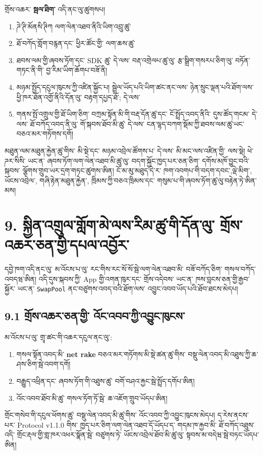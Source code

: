 \documentclass[11pt]{article}
\begin{document}
གྲོས་འཆར་ \textbf{སྦལ་ཐིག་} འདི་ནང་ལུ་ཚུགསཔ།

\begin{enumerate}[leftmargin=*]
\item ཌེ་ཊི་མོནསི་ཊིཀ ལག་ལེན་འཐབ་ནིའི་ཡིག་འབྲུ་ཚུ་
\item ཐོ་བཀོད་གློག་བརྙན་དང་ ཕྱིར་ཚོང་གྱི་ ལག་ཆས་ཚུ་
\item ཐབས་ལམ་གྱི་ཞབས་ཏོག་དང་ SDK ཚུ་ དེ་ལས་ བརྡ་འགྲེལཔ་ཚུ་ལུ་ རྩ་སྒྲིག་གསརཔ་ཅིག་ལུ་ བཏོན་གཏང་ནི་གི་ བྱ་རིམ་ཡིག་ཆོགཔ་བཟོ་ནི།
\item མཉམ་སྤྱོད་དངུལ་ཁུངས་ཀྱི་འཛིན་སྐྱོང་པ། སྦྲེལ་ཡོད་པའི་ཡིག་ཚང་ནང་ལས་ ཉེན་སྲུང་ལྡན་པའི་ཐོག་ལས་ ཕྱི་ཁར་ཐོན་འགྱོ་ནིའི་དོན་ལུ་ བརྟག་དཔྱད་ཐོ་; དེ་ལས་
\item གནས་སྤོ་འགྲུལ་གྱི་ཐོ་ཡིག་ཅིག་ བཀྲམ་སྟོན་མི་གི་བརྡ་དོན་ཚུ་དང་ ངོ་སྤྲོད་འབད་ནིའི་ དུས་ཚོད་གངམ་ དེ་ལས་ ཐོ་བཀོད་འབད་ནི་ལུ་ གོ་སྐབས་ཐོབ་མི་ཚུ་ དེ་ལས་ ངན་ལྷད་བཀག་སྡོམ་ཀྱི་ཐབས་ལམ་ཚུ་ཡང་ བཅའ་མར་གཏོགས་དགོ།
\end{enumerate}
མཐུན་ལམ་མཐུན་རྐྱེན་ཚུ་གིས་ མི་སྡེ་དང་ མཉམ་འབྲེལ་ཚོགས་པ་ དེ་ལས་ མི་མང་ལས་འཛིན་གྱི་ ལས་སྡེ། ཕེ་ཌར་སིསི་ ཡང་ན་ ཞབས་ཏོག་ལག་ལེན་འཐབ་མི་ཚུ་ལུ་ བདག་སྐྱོང་ཁྱད་པར་ཅན་ཅིག་ དགོས་མཁོ་བྱུང་བའི་སྐབས་ ལྕོགས་གྲུབ་ཡར་དྲག་གཏང་ཚུགས་ཨིན། ངོ་མ་མུ་མཐུད་དེ་ར་ ཁག་འབགཔ་གི་བདག་དབང་,ལྡེ་མིག་, ཡོངས་འབྲེལ་, གཞི་རྟེན་མཐུན་རྐྱེན་, ཁྲིམས་ཀྱི་བཅའ་ཁྲིམས་དང་ གསུམ་པ་གི་ཞབས་ཏོག་ཚུ་ལུ་བརྟེན་ཏེ་ཨིན་མས།


\section*{9. སྐྱིན་འགྲུལ་གློག་མེ་ལས་རིམ་ཚུ་གི་དོན་ལུ་ གྲོས་འཆར་ཅན་གྱི་དཔལ་འབྱོར་}

དབྱེ་ཁག་འདི་ནང་ལུ་ མ་འོངས་པ་ལུ་ རང་གིས་རང་སོ་སོ་སྦེ་ལག་ལེན་འཐབ་མི་ བཟོ་བཀོད་ཅིག་ གསལ་བཀོད་འབདཝ་ཨིན། འདི་དུས་སྐབས་ཀྱི་ App གྱི་འགན་ཁུར་དང་ གྲོས་འདེབས་ ཡང་ན་ ཁས་བླངས་ཅན་གྱི་རྒྱབ་སྐྱོར་ ཡང་ན་ \texttt{SwapPool} ནང་བཙུགས་འབད་བའི་ཐོག་ལས་ འབྱུང་འབབ་ཡོད་པའི་ཐོབ་ཐངས་མེདཔ།

\subsection*{9.1 གྲོས་འཆར་ཅན་གྱི་ འོང་འབབ་ཀྱི་འབྱུང་ཁུངས་}

མ་འོངས་པ་ལུ་ གྲྭ་ཚང་གི་འཆར་དངུལ་ནང་ལུ་:

\begin{enumerate}[leftmargin=*]
\item གསལ་སྟོན་འབད་མི་ \textbf{net rake} བཅའ་མར་གཏོགས་མི་སྡེ་ཚན་ཚུ་གིས་ བསྡུ་ལེན་འབད་མི་འཐུས་ཀྱི་ཆ་ཤས་ཅིག་སྦེ་འབག་དགོ།
\item བརྒྱུད་འཕྲིན་དང་ ཞབས་ཏོག་གི་འཐུས་ཚུ་ བགོ་བཤའ་རྐྱང་སྦེ་སྤྲོད་དགོཔ་ཨིན།
\item འོང་འབབ་ཐོབ་མི་ཚུ་ གསལ་ཏོག་ཏོ་སྦེ་ ཆ་འཇོག་གྲུབ་ཡོདཔ་ཨིན།
\end{enumerate}
གྲོང་གསེབ་གི་དངུལ་ཕོགས་ཚུ་ བསྡུ་ལེན་འབད་མི་ཚུ་གིས་ འོང་འབབ་ཀྱི་འབྱུང་ཁུངས་མེདཔ། ད་རེས་ནངས་པར་ Protocol v1.1.0 གིས་ ཁྱད་པར་ཅིག་ལག་ལེན་འཐབ་དོ་ཡོདཔ་ད་ གདམ་ཁ་རྐྱབ་མི་ ཐོ་བཀོད་འཐུས་འདི་ གྲོང་རྡལ་གྱི་གླ་ཁར་འཕར་སྣོན་སྦེ་ བཙུགས་ཏེ་ ཡོངས་འབྲེལ་ཐོབ་མི་ཚུ་ལུ་ སྟབས་མ་བདེཝ་སྦེ་བཏང་ཡོདཔ་ཨིན།
\end{document}
